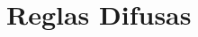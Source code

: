 \documentclass[12pt,a4paper,spanish]{article}
\begin{document}
	
\clearpage
\section{Reglas Difusas}







\end{document}
